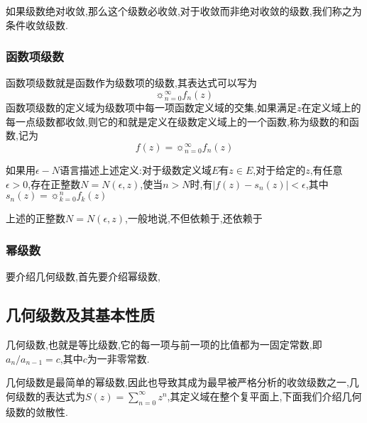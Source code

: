 \documentclass[zihao=-4,a4paper]{ctexart}
\begin{document}
如果级数绝对收敛,那么这个级数必收敛,对于收敛而非绝对收敛的级数,我们称之为条件收敛级数.

\subsubsection{函数项级数}

函数项级数就是函数作为级数项的级数,其表达式可以写为
\begin{equation}
	\sun^{\infty}_{n=0} {f}_{n} \left( {z} \right)
\end{equation}
函数项级数的定义域为级数项中每一项函数定义域的交集,如果满足$z$在定义域上的每一点级数都收敛,则它的和就是定义在级数定义域上的一个函数,称为级数的和函数,记为
\begin{equation}
	{f} \left( {z} \right) = \sun^{\infty}_{n=0} {f}_{n} \left( {z} \right)
\end{equation}

如果用${\epsilon} - {N}$语言描述上述定义:对于级数定义域$E$有$z {\in} E$,对于给定的$z$,有任意${\epsilon} > {0}$,存在正整数$N = N\left( {\epsilon} , {z} \right)$,使当${n} > {N}$时,有$| {f} \left( {z} \right) - {s}_{n} \left( {z} \right) | < {\epsilon}$,其中${s}_{n} \left( {z} \right) = \sun^{n}_{k=0} {f}_{k} \left( {z} \right)$

上述的正整数${N} = {N} \left( {\epsilon} , {z} \right)$,一般地说,不但依赖于,还依赖于
\subsubsection{幂级数}
要介绍几何级数,首先要介绍幂级数,

\subsection{几何级数及其基本性质}

几何级数,也就是等比级数,它的每一项与前一项的比值都为一固定常数,即${a}_{n}/{a}_{n-1}=c$,其中$c$为一非零常数.

几何级数是最简单的幂级数,因此也导致其成为最早被严格分析的收敛级数之一,几何级数的表达式为$S\left(z\right)=\sum^{\infty}_{n=0}{z}^{n}$,其定义域在整个复平面上,下面我们介绍几何级数的敛散性.








\end{document}
